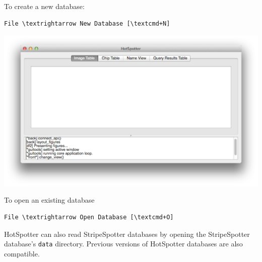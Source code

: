 \documentclass[a4paper,10pt]{article}
\begin{document}
    \renewcommand{\textrightarrow}{$\rightarrow$}
    \newcommand{\textcmd}{\cmdkey}

    To create a new database: \\
    \begin{Verbatim}[commandchars=\\\{\}]
    File \textrightarrow New Database [\textcmd+N]
    \end{Verbatim}

    \begin{center}
        \includegraphics[scale=0.15]{images/start.png}
    \end{center}

    To open an existing database
    \begin{Verbatim}[commandchars=\\\{\}]
    File \textrightarrow Open Database [\textcmd+O]
    \end{Verbatim}


    HotSpotter can also read StripeSpotter databases by opening the
    StripeSpotter database's {\tt data} directory.  Previous versions of HotSpotter databases
   are also compatible.
    
\end{document}
